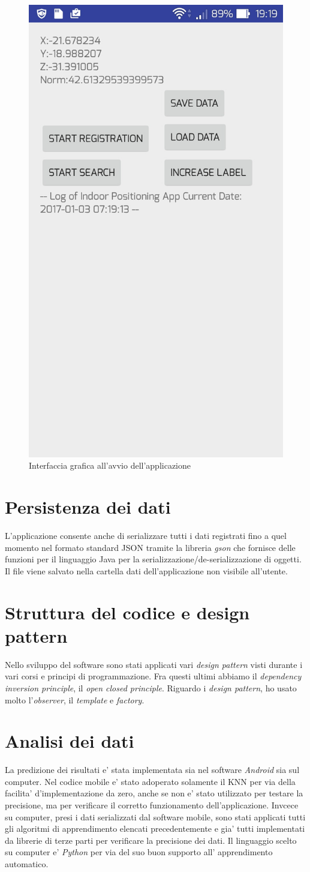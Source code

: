 \begin{figure}[H]
\centering
\includegraphics[width=0.3\linewidth]{img/app_screen}
\caption{Interfaccia grafica all'avvio dell'applicazione}
\label{fig:app_screen}
\end{figure}

\section*{Persistenza dei dati}
L'applicazione consente anche di serializzare tutti i dati registrati fino a quel momento nel formato standard JSON tramite la libreria \textit{gson} che fornisce delle funzioni  per il linguaggio Java per la serializzazione/de-serializzazione di oggetti. Il file viene salvato nella cartella dati dell'applicazione non visibile all'utente.

\section*{Struttura del codice e design pattern}
Nello sviluppo del software sono stati applicati vari \textit{design pattern} visti durante i vari corsi e principi di programmazione. Fra questi ultimi abbiamo il \textit{dependency inversion principle}, il \textit{open closed principle}. Riguardo i \textit{design pattern}, ho usato molto l'\textit{observer}, il \textit{template} e \textit{factory}.


\section*{Analisi dei dati}
La predizione dei risultati e' stata implementata sia nel software \textit{Android} sia sul computer. Nel codice mobile e' stato adoperato solamente il KNN per via della facilita' d'implementazione da zero, anche se non e' stato  utilizzato per testare la precisione, ma per verificare il corretto funzionamento dell'applicazione. Invcece su computer, presi i dati serializzati dal software mobile, sono stati applicati tutti gli algoritmi di apprendimento elencati precedentemente e gia' tutti implementati da librerie di terze parti per verificare la precisione dei dati. Il linguaggio scelto su computer e' \textit{Python} per via del suo buon supporto all' apprendimento automatico.